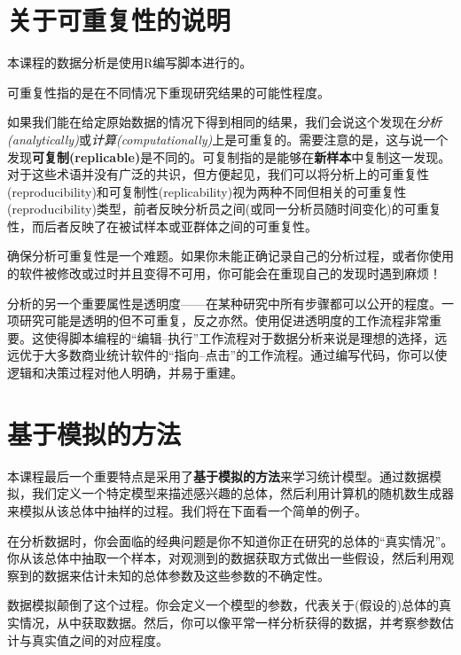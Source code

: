 \documentclass[
]{book}
\begin{document}
\hypertarget{ux5173ux4e8eux53efux91cdux590dux6027ux7684ux8bf4ux660e}{%
\section{关于可重复性的说明}\label{ux5173ux4e8eux53efux91cdux590dux6027ux7684ux8bf4ux660e}}

本课程的数据分析是使用R编写脚本进行的。

可重复性指的是在不同情况下重现研究结果的可能性程度。

如果我们能在给定原始数据的情况下得到相同的结果，我们会说这个发现在\emph{分析(analytically)}或\emph{计算(computationally)}上是可重复的。需要注意的是，这与说一个发现\textbf{可复制(replicable)}是不同的。可复制指的是能够在\textbf{新样本}中复制这一发现。对于这些术语并没有广泛的共识，但方便起见，我们可以将分析上的可重复性(reproducibility)和可复制性(replicability)视为两种不同但相关的可重复性(reproducibility)类型，前者反映分析员之间(或同一分析员随时间变化)的可重复性，而后者反映了在被试样本或亚群体之间的可重复性。

确保分析可重复性是一个难题。如果你未能正确记录自己的分析过程，或者你使用的软件被修改或过时并且变得不可用，你可能会在重现自己的发现时遇到麻烦！

分析的另一个重要属性是透明度------在某种研究中所有步骤都可以公开的程度。一项研究可能是透明的但不可重复，反之亦然。使用促进透明度的工作流程非常重要。这使得脚本编程的``编辑--执行''工作流程对于数据分析来说是理想的选择，远远优于大多数商业统计软件的``指向--点击''的工作流程。通过编写代码，你可以使逻辑和决策过程对他人明确，并易于重建。

\hypertarget{ux57faux4e8eux6a21ux62dfux7684ux65b9ux6cd5}{%
\section{基于模拟的方法}\label{ux57faux4e8eux6a21ux62dfux7684ux65b9ux6cd5}}

本课程最后一个重要特点是采用了\textbf{基于模拟的方法}来学习统计模型。通过数据模拟，我们定义一个特定模型来描述感兴趣的总体，然后利用计算机的随机数生成器来模拟从该总体中抽样的过程。我们将在下面看一个简单的例子。

在分析数据时，你会面临的经典问题是你不知道你正在研究的总体的``真实情况''。你从该总体中抽取一个样本，对观测到的数据获取方式做出一些假设，然后利用观察到的数据来估计未知的总体参数及这些参数的不确定性。

数据模拟颠倒了这个过程。你会定义一个模型的参数，代表关于(假设的)总体的真实情况，从中获取数据。然后，你可以像平常一样分析获得的数据，并考察参数估计与真实值之间的对应程度。
\end{document}
